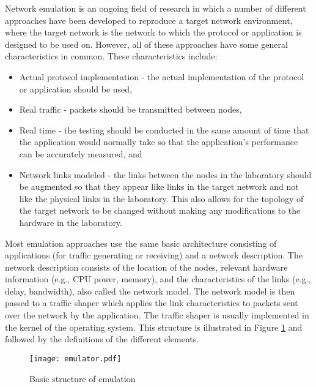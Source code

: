 Network emulation is an ongoing field of research in which a number of different approaches have been developed to reproduce a target network environment, where the target network is the network to which the protocol or application is designed to be used on. However, all of these approaches have some general characteristics in common. These characteristics include:

\begin{itemize}
	\item Actual protocol implementation - the actual implementation of the protocol or application should be used,
	\item Real traffic - packets should be transmitted between nodes,
	\item Real time - the testing should be conducted in the same amount of time that the application would normally take so that the application's performance can be accurately measured, and
	\item Network links modeled - the links between the nodes in the laboratory should be augmented so that they appear like links in the target network and not like the physical links in the laboratory. This also allows for the topology of the target network to be changed without making any modifications to the hardware in the laboratory.
\end{itemize}

Most emulation approaches use the same basic architecture consisting of applications (for traffic generating or receiving) and a network description. The network description consists of the location of the nodes, relevant hardware information (e.g., CPU power, memory), and the characteristics of the links (e.g., delay, bandwidth), also called the network model. The network model is then passed to a traffic shaper which applies the link characteristics to packets sent over the network by the application. The traffic shaper is usually implemented in the kernel of the operating system. This structure is illustrated in Figure \ref{fig:emulator} and followed by the definitions of the different elements.

\begin{figure}[H]
\begin{center}
	{\texttt{[image: emulator.pdf]}}
	\caption{Basic structure of emulation}
	\label{fig:emulator}
\end{center}
\end{figure}

